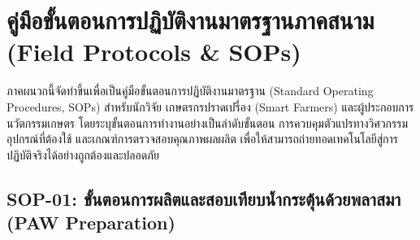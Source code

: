 
\chapter{คู่มือขั้นตอนการปฏิบัติงานมาตรฐานภาคสนาม (Field Protocols \& SOPs)}
\label{app:field_protocols}

ภาคผนวกนี้จัดทำขึ้นเพื่อเป็นคู่มือขั้นตอนการปฏิบัติงานมาตรฐาน (Standard Operating Procedures, SOPs) สำหรับนักวิจัย เกษตรกรปราดเปรื่อง (Smart Farmers) และผู้ประกอบการนวัตกรรมเกษตร โดยระบุขั้นตอนการทำงานอย่างเป็นลำดับขั้นตอน การควบคุมตัวแปรทางวิศวกรรม อุปกรณ์ที่ต้องใช้ และเกณฑ์การตรวจสอบคุณภาพผลผลิต เพื่อให้สามารถถ่ายทอดเทคโนโลยีสู่การปฏิบัติจริงได้อย่างถูกต้องและปลอดภัย

\section{SOP-01: ขั้นตอนการผลิตและสอบเทียบน้ำกระตุ้นด้วยพลาสมา (PAW Preparation)}
\label{app:sop_paw}


